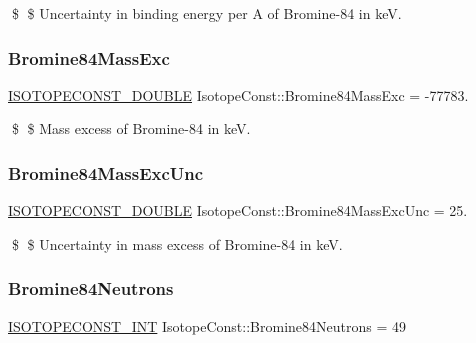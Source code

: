 \$ \$ Uncertainty in binding energy per A of Bromine-\/84 in keV. \mbox{\label{group___isotope_const-_bromine-_br84_gac5b4b6372d3c3c47b5adaac2a297b659}} 
\subsubsection{\texorpdfstring{Bromine84\+Mass\+Exc}{Bromine84MassExc}}
{\footnotesize\ttfamily \mbox{\hyperlink{group___isotope_const-_macros_ga8f45a7272ce02c0b4c65c44636ed719a}{I\+S\+O\+T\+O\+P\+E\+C\+O\+N\+S\+T\+\_\+\+D\+O\+U\+B\+LE}} Isotope\+Const\+::\+Bromine84\+Mass\+Exc = -\/77783.}

\$ \$ Mass excess of Bromine-\/84 in keV. \mbox{\label{group___isotope_const-_bromine-_br84_ga612593ddf60cf0ec2749bdf053463395}} 
\subsubsection{\texorpdfstring{Bromine84\+Mass\+Exc\+Unc}{Bromine84MassExcUnc}}
{\footnotesize\ttfamily \mbox{\hyperlink{group___isotope_const-_macros_ga8f45a7272ce02c0b4c65c44636ed719a}{I\+S\+O\+T\+O\+P\+E\+C\+O\+N\+S\+T\+\_\+\+D\+O\+U\+B\+LE}} Isotope\+Const\+::\+Bromine84\+Mass\+Exc\+Unc = 25.}

\$ \$ Uncertainty in mass excess of Bromine-\/84 in keV. \mbox{\label{group___isotope_const-_bromine-_br84_gacbec223541142921030c6f8be2b33285}} 
\subsubsection{\texorpdfstring{Bromine84\+Neutrons}{Bromine84Neutrons}}
{\footnotesize\ttfamily \mbox{\hyperlink{group___isotope_const-_macros_ga5f18360b3e99483a35c32d789e62621c}{I\+S\+O\+T\+O\+P\+E\+C\+O\+N\+S\+T\+\_\+\+I\+NT}} Isotope\+Const\+::\+Bromine84\+Neutrons = 49}

